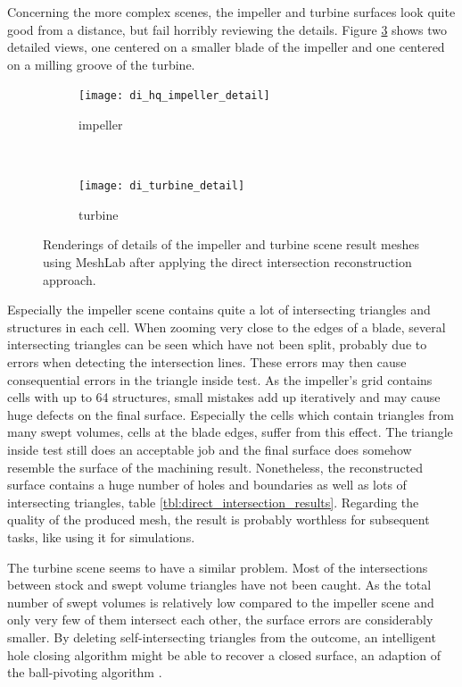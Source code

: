 Concerning the more complex scenes, the impeller and turbine surfaces look quite good from a distance, but fail horribly reviewing the details.
Figure \ref{fig:di_scenes_artifacts} shows two detailed views, one centered on a smaller blade of the impeller and one centered on a milling groove of the turbine.
%
\begin{figure}[h]
	\centering
	\begin{subfigure}[b]{\textwidth}
		\centering
		\texttt{[image: di\_hq\_impeller\_detail]}
		\caption{impeller}
		\label{fig:di_impeller_detail}
	\end{subfigure}\\
	\begin{subfigure}[b]{\textwidth}
		\centering
		\texttt{[image: di\_turbine\_detail]}
		\caption{turbine}
		\label{fig:di_turbine_detail}
	\end{subfigure}
	\caption{
		Renderings of details of the impeller and turbine scene result meshes using MeshLab after applying the direct intersection reconstruction approach.
	}
	\label{fig:di_scenes_artifacts}
\end{figure}
%
Especially the impeller scene contains quite a lot of intersecting triangles and structures in each cell.
When zooming very close to the edges of a blade, several intersecting triangles can be seen which have not been split, probably due to errors when detecting the intersection lines.
These errors may then cause consequential errors in \eg the triangle inside test.
As the impeller's grid contains cells with up to 64 structures, small mistakes add up iteratively and may cause huge defects on the final surface.
Especially the cells which contain triangles from many swept volumes, \ie cells at the blade edges, suffer from this effect.
The triangle inside test still does an acceptable job and the final surface does somehow resemble the surface of the machining result.
Nonetheless, the reconstructed surface contains a huge number of holes and boundaries as well as lots of intersecting triangles, \cf table \ref{tbl:direct_intersection_results}.
Regarding the quality of the produced mesh, the result is probably worthless for subsequent tasks, like using it for simulations.

The turbine scene seems to have a similar problem.
Most of the intersections between stock and swept volume triangles have not been caught.
As the total number of swept volumes is relatively low compared to the impeller scene and only very few of them intersect each other, the surface errors are considerably smaller.
By deleting self-intersecting triangles from the outcome, an intelligent hole closing algorithm might be able to recover a closed surface, \eg an adaption of the ball-pivoting algorithm \cite{bpa}.

